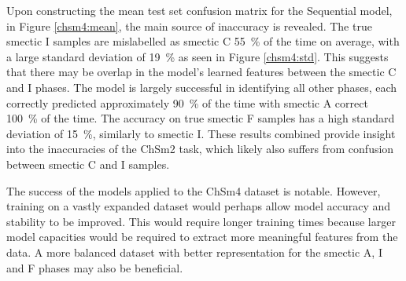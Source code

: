 \documentclass[12pt]{article}
\begin{document}
Upon constructing the mean test set confusion matrix for the Sequential model, in Figure \ref{chsm4:mean}, the main source of inaccuracy is revealed. The true smectic I samples are mislabelled as smectic C \SI{55}{\percent} of the time on average, with a large standard deviation of \SI{19}{\percent} as seen in Figure \ref{chsm4:std}. This suggests that there may be overlap in the model's learned features between the smectic C and I phases. The model is largely successful in identifying all other phases, each correctly predicted approximately \SI{90}{\percent} of the time with smectic A correct \SI{100}{\percent} of the time. The accuracy on true smectic F samples has a high standard deviation of \SI{15}{\percent}, similarly to smectic I. These results combined provide insight into the inaccuracies of the ChSm2 task, which likely also suffers from confusion between smectic C and I samples.

The success of the models applied to the ChSm4 dataset is notable. However, training on a vastly expanded dataset would perhaps allow model accuracy and stability to be improved. This would require longer training times because larger model capacities would be required to extract more meaningful features from the data. A more balanced dataset with better representation for the smectic A, I and F phases may also be beneficial.
\end{document}
